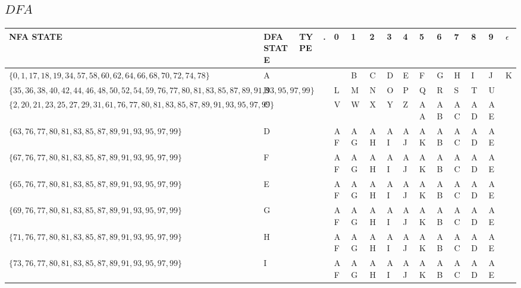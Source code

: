 \documentclass[a3paper]{report}
\begin{document}
\pagebreak
\begin{landscape}
    \section*{$DFA$}
    \begin{table}[h]
        \centering
        \begin{tabular}{| l | l | l | l | l | l | l | l | l | l | l | l | l | l | l |}
            \hline
            NFA STATE                                                                        & DFA STATE & TYPE   & .  & 0  & 1  & 2  & 3  & 4  & 5  & 6  & 7  & 8  & 9  & $\epsilon$ \\ \hline
            $\{0,1,17,18,19,34,57,58,60,62,64,66,68,70,72,74,78\}$                           & A         &        &    &    & B  & C  & D  & E  & F  & G  & H  & I  & J  & K          \\
            $\{35,36,38,40,42,44,46,48,50,52,54,59,76,77,80,81,83,85,87,89,91,93,95,97,99\}$ & B         &        &    & L  & M  & N  & O  & P  & Q  & R  & S  & T  & U  &            \\
            $\{2,20,21,23,25,27,29,31,61,76,77,80,81,83,85,87,89,91,93,95,97,99\}$           & C         &        &    & V  & W  & X  & Y  & Z  & AA & AB & AC & AD & AE &            \\
            $\{63,76,77,80,81,83,85,87,89,91,93,95,97,99\}$                                  & D         &        &    & AF & AG & AH & AI & AJ & AK & AB & AC & AD & AE &            \\
            $\{67,76,77,80,81,83,85,87,89,91,93,95,97,99\}$                                  & F         &        &    & AF & AG & AH & AI & AJ & AK & AB & AC & AD & AE &            \\
            $\{65,76,77,80,81,83,85,87,89,91,93,95,97,99\}$                                  & E         &        &    & AF & AG & AH & AI & AJ & AK & AB & AC & AD & AE &            \\
            $\{69,76,77,80,81,83,85,87,89,91,93,95,97,99\}$                                  & G         &        &    & AF & AG & AH & AI & AJ & AK & AB & AC & AD & AE &            \\
            $\{71,76,77,80,81,83,85,87,89,91,93,95,97,99\}$                                  & H         &        &    & AF & AG & AH & AI & AJ & AK & AB & AC & AD & AE &            \\
            $\{73,76,77,80,81,83,85,87,89,91,93,95,97,99\}$                                  & I         &        &    & AF & AG & AH & AI & AJ & AK & AB & AC & AD & AE &            \\

\end{tabular}
\end{table}
\end{landscape}
\end{document}
